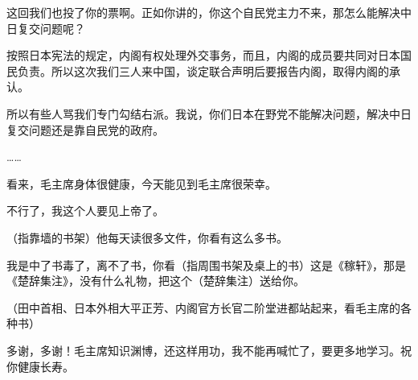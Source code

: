 这回我们也投了你的票啊。正如你讲的，你这个自民党主力不来，那怎么能解决中日复交问题呢？

按照日本宪法的规定，内阁有权处理外交事务，而且，内阁的成员要共同对日本国民负责。所以这次我们三人来中国，谈定联合声明后要报告内阁，取得内阁的承认。

所以有些人骂我们专门勾结右派。我说，你们日本在野党不能解决问题，解决中日复交问题还是靠自民党的政府。

……

看来，毛主席身体很健康，今天能见到毛主席很荣幸。

不行了，我这个人要见上帝了。

（指靠墙的书架）他每天读很多文件，你看有这么多书。

我是中了书毒了，离不了书，你看（指周围书架及桌上的书）这是《稼轩》，那是《楚辞集注》，没有什么礼物，把这个（楚辞集注）送给你。

（田中首相、日本外相大平正芳、内阁官方长官二阶堂进都站起来，看毛主席的各种书）

多谢，多谢！毛主席知识渊博，还这样用功，我不能再喊忙了，要更多地学习。祝你健康长寿。

